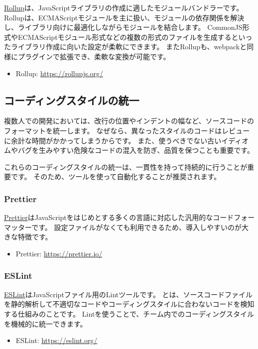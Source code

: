 \href{https://rollupjs.org/}{Rollup}は、JavaScriptライブラリの作成に適したモジュールバンドラーです。
Rollupは、ECMAScriptモジュールを主に扱い、モジュールの依存関係を解決し、ライブラリ向けに最適化しながらモジュールを結合します。
CommonJS形式やECMAScriptモジュール形式などの複数の形式のファイルを生成するといったライブラリ作成に向いた設定が柔軟にできます。
またRollupも、webpackと同様にプラグインで拡張でき、柔軟な変換が可能です。
\begin{itemize}
\item Rollup: \url{https://rollupjs.org/}
\end{itemize}

\hypertarget{coding-style}{%
\subsection{コーディングスタイルの統一}\label{coding-style}}

複数人での開発においては、改行の位置やインデントの幅など、ソースコードのフォーマットを統一します。
なぜなら、異なったスタイルのコードはレビューに余計な時間がかかってしまうからです。
また、使うべきでない古いイディオムやバグを生みやすい危険なコードの混入を防ぎ、品質を保つことも重要です。

これらのコーディングスタイルの統一は、一貫性を持って持続的に行うことが重要です。
そのため、ツールを使って自動化することが推奨されます。

\hypertarget{prettier}{%
\subsubsection{Prettier}\label{prettier}}

\href{https://prettier.io/}{Prettier}はJavaScriptをはじめとする多くの言語に対応した汎用的なコードフォーマッターです。
設定ファイルがなくても利用できるため、導入しやすいのが大きな特徴です。
\begin{itemize}
\item Prettier: \url{https://prettier.io/}
\end{itemize}

\hypertarget{eslint}{%
\subsubsection{ESLint}\label{eslint}}

\href{https://eslint.org/}{ESLint}はJavaScriptファイル用のLintツールです。
\textbf{}
とは、ソースコードファイルを静的解析して不適切なコードやコーディングスタイルに合わないコードを検知する仕組みのことです。
Lintを使うことで、チーム内でのコーディングスタイルを機械的に統一できます。
\begin{itemize}
\item ESLint: \url{https://eslint.org/}
\end{itemize}

